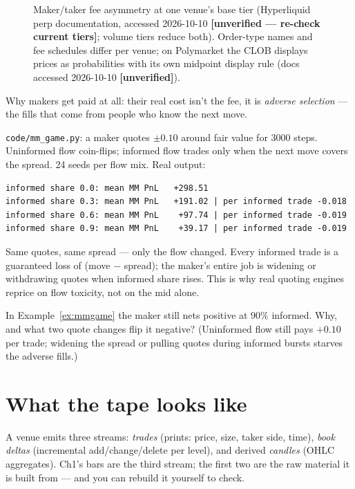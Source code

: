 \begin{figure}[ht]\centering

\caption{Maker/taker fee asymmetry at one venue's base tier
(Hyperliquid perp documentation, accessed 2026-10-10
\textbf{[unverified --- re-check current tiers]}; volume tiers reduce
both). Order-type names and fee schedules differ per venue; on
Polymarket the CLOB displays prices as probabilities with its own
midpoint display rule (docs accessed 2026-10-10 \textbf{[unverified]}).}
\label{fig:fees}
\end{figure}

Why makers get paid at all: their real cost isn't the fee, it is
\emph{adverse selection} --- the fills that come from people who
know the next move.

\begin{example}\label{ex:mmgame}
\texttt{code/mm\_game.py}: a maker quotes $\pm0.10$ around fair
value for 3000 steps. Uninformed flow coin-flips; informed flow
trades only when the next move covers the spread. 24 seeds per
flow mix. Real output:
\begin{lstlisting}[numbers=none]
informed share 0.0: mean MM PnL   +298.51
informed share 0.3: mean MM PnL   +191.02 | per informed trade -0.018
informed share 0.6: mean MM PnL    +97.74 | per informed trade -0.019
informed share 0.9: mean MM PnL    +39.17 | per informed trade -0.019
\end{lstlisting}
Same quotes, same spread --- only the flow changed. Every informed
trade is a guaranteed loss of (move $-$ spread); the maker's entire
job is widening or withdrawing quotes when informed share rises.
This is why real quoting engines reprice on flow toxicity, not on
the mid alone.
\end{example}

\begin{checkpoint}
In Example~\ref{ex:mmgame} the maker still nets positive at 90\%
informed. Why, and what two quote changes flip it negative?
(Uninformed flow still pays $+0.10$ per trade; widening the spread
or pulling quotes during informed bursts starves the adverse
fills.)
\end{checkpoint}

\section{What the tape looks like}\label{sec:tape}
A venue emits three streams: \emph{trades} (prints: price, size,
taker side, time), \emph{book deltas} (incremental
add/change/delete per level), and derived \emph{candles} (OHLC
aggregates). Ch1's bars are the third stream; the first two are the
raw material it is built from --- and you can rebuild it yourself to
check.

